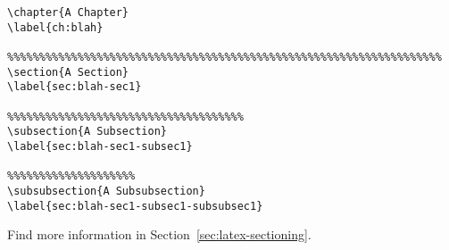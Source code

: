 \begin{framed}
\begin{verbatim}
\chapter{A Chapter}
\label{ch:blah}

%%%%%%%%%%%%%%%%%%%%%%%%%%%%%%%%%%%%%%%%%%%%%%%%%%%%%%%%%%%%%%%%%%%%
\section{A Section}
\label{sec:blah-sec1}

%%%%%%%%%%%%%%%%%%%%%%%%%%%%%%%%%%%%%
\subsection{A Subsection}
\label{sec:blah-sec1-subsec1}

%%%%%%%%%%%%%%%%%%%%
\subsubsection{A Subsubsection}
\label{sec:blah-sec1-subsec1-subsubsec1}
\end{verbatim}
Find more information in Section~\ref{sec:latex-sectioning}.
\end{framed}
